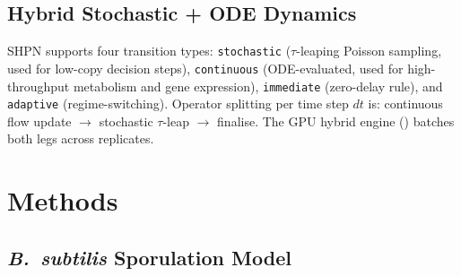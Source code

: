 \documentclass[11pt,a4paper]{article}
\begin{document}
\subsection{Hybrid Stochastic + ODE Dynamics}

SHPN supports four transition types: \texttt{stochastic} (\(\tau\)-leaping
Poisson sampling, used for low-copy decision steps), \texttt{continuous}
(ODE-evaluated, used for high-throughput metabolism and gene expression),
\texttt{immediate} (zero-delay rule), and \texttt{adaptive} (regime-switching).
Operator splitting per time step \(dt\) is: continuous flow update
\(\to\) stochastic \(\tau\)-leap \(\to\) finalise.  The GPU hybrid engine
() batches both legs across replicates.

\section{Methods}
\label{sec:methods}

\subsection{\textit{B.~subtilis} Sporulation Model}
\end{document}
